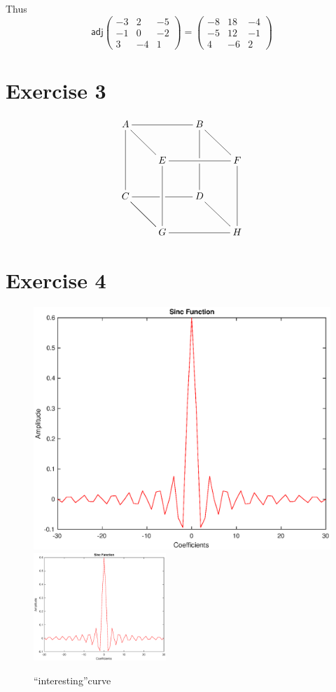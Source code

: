 \documentclass[a4paper,12pt]{article}
\begin{document}
Thus
\begin{equation}
\mathsf{adj}
\begin{pmatrix}
	-3&2&-5\\
	-1&0&-2\\
	 3&-4&1
\end{pmatrix}
=
\begin{pmatrix}
-8&18&-4\\
-5&12&-1\\
4&-6&2
\end{pmatrix}
\end{equation}

\section*{Exercise 3}

\[
\xymatrix{
A\ar@{-}[rr]\ar@{-}[dr]\ar@{-}[dd]
&&B\ar@{-}[dd]|\hole\ar@{-}[dr]\\
&E\ar@{-}[rr]\ar@{-}[dd]
&&F\ar@{-}[dd]\\C\ar@{-}[rr]|\hole
\ar@{-}[dr]
&&D\ar@{-}[dr]\\
&G\ar@{-}[rr]\ar@{-}[ul]
&&H
}
\]
\section*{Exercise 4}
\begin{figure}[b!]
\centering
\includegraphics[width=\textwidth]{sinc.eps}
\includegraphics[width=5cm,angle=30]{sinc.eps}
\caption{\textquotedblleft interesting\textquotedblright curve}
\end{figure}
\pagebreak
\end{document}
